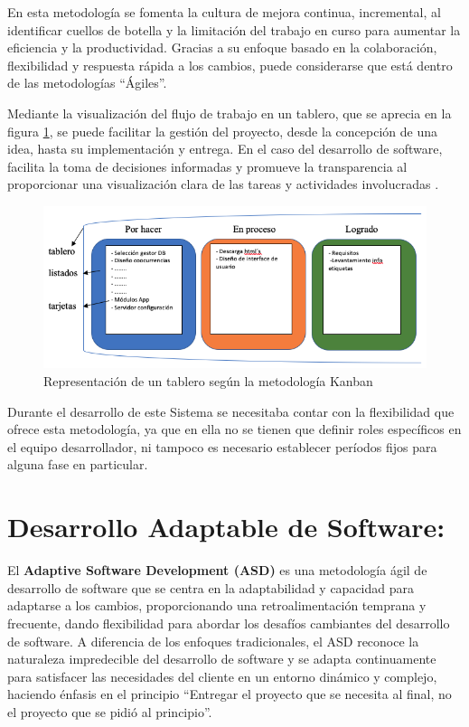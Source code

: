 \documentclass[
  12pt,
  openany]{book}
\begin{document}
En esta metodología se fomenta la cultura de mejora continua, incremental, al identificar cuellos de botella y la limitación del trabajo en curso para aumentar la eficiencia y la productividad. Gracias a su enfoque basado en la colaboración, flexibilidad y respuesta rápida a los cambios, puede considerarse que está dentro de las metodologías ``Ágiles''.

Mediante la visualización del flujo de trabajo en un tablero, que se aprecia en la figura \ref{fig:metkanban}, se puede facilitar la gestión del proyecto, desde la concepción de una idea, hasta su implementación y entrega. En el caso del desarrollo de software, facilita la toma de decisiones informadas y promueve la transparencia al proporcionar una visualización clara de las tareas y actividades involucradas \citep{stephens2015}.

\begin{figure}

{\centering \includegraphics[width=0.7\linewidth]{images/04-metodologia/01_kanban} 

}

\caption{Representación de un tablero según la metodología Kanban}\label{fig:metkanban}
\end{figure}

Durante el desarrollo de este Sistema se necesitaba contar con la flexibilidad que ofrece esta metodología, ya que en ella no se tienen que definir roles específicos en el equipo desarrollador, ni tampoco es necesario establecer períodos fijos para alguna fase en particular.

\hypertarget{mmasd}{%
\section{Desarrollo Adaptable de Software:}\label{mmasd}}

El \textbf{Adaptive Software Development (ASD)} \citep{highsmith2000} es una metodología ágil de desarrollo de software que se centra en la adaptabilidad y capacidad para adaptarse a los cambios, proporcionando una retroalimentación temprana y frecuente, dando flexibilidad para abordar los desafíos cambiantes del desarrollo de software. A diferencia de los enfoques tradicionales, el ASD reconoce la naturaleza impredecible del desarrollo de software y se adapta continuamente para satisfacer las necesidades del cliente en un entorno dinámico y complejo, haciendo énfasis en el principio ``Entregar el proyecto que se necesita al final, no el proyecto que se pidió al principio''.
\end{document}
